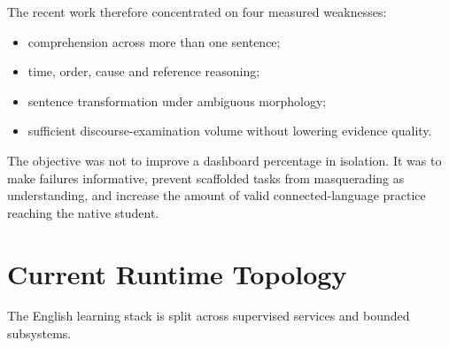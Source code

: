 \documentclass[11pt,a4paper]{article}
\begin{document}
The recent work therefore concentrated on four measured weaknesses:

\begin{itemize}
  \item comprehension across more than one sentence;
  \item time, order, cause and reference reasoning;
  \item sentence transformation under ambiguous morphology;
  \item sufficient discourse-examination volume without lowering evidence quality.
\end{itemize}

The objective was not to improve a dashboard percentage in isolation. It was to make failures
informative, prevent scaffolded tasks from masquerading as understanding, and increase the
amount of valid connected-language practice reaching the native student.

\section{Current Runtime Topology}

The English learning stack is split across supervised services and bounded subsystems.
\end{document}
